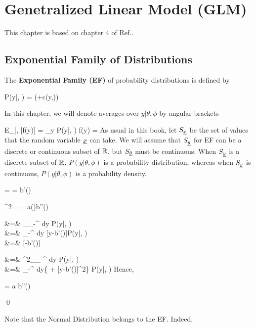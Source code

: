 \chapter{Genetralized Linear Model (GLM)}
\label{ch-gen-lin-mod}

This chapter is based on
chapter 4 of Ref.\cite{agresti-book}.

\section{Exponential Family of Distributions}
\label{sec-exp-fam}

The {\bf Exponential Family (EF)} of probability distributions is defined by

\beq
P(y|\theta, \phi) =
\exp\left(+c(y,\phi)\right)
\eeq

In this chapter, we will
denote averages over $y|\theta, \phi$ by angular brackets

\beq
E_{\rvy|\theta, \phi}[f(y)] = \sum_y P(y|\theta, \phi) f(y) = 
\eeq
As usual in this book, let $S_{\underline{x}}$ be the set of
values that the random variable ${\underline{x}}$ can take.
We will assume that $S_{\underline{y}}$
for EF
can be a discrete or continuous
subset of ${ \mathbb{R}}$,
but $S_{\underline{\theta}}$
must be continuous.
When $S_{\underline{y}}$ is a discrete subset of ${ \mathbb{R}}$, $P(y|\theta, \phi)$
is a probability distribution, whereas when
$S_{\underline{y}}$ is continuous, $P(y|\theta, \phi)$
is a probability density.

\begin{claim}
\beq
\mu = \av{\rvy} = b'(\theta)
\eeq

\beq
\s^2= \av{\rvy, \rvy} = a(\phi)b''(\theta)
\eeq
\end{claim}
\proof

&=& \partial_\theta \int_{-\infty}^\infty
dy\; P(y|\theta, \phi)
\\
&=&
\int_{-\infty}^\infty
dy\;
[y-b'(\theta)]P(y|\theta, \phi)
\\
&=&
[\av{\rvy}-b'(\theta)]
\eeqa

&=& \partial^2_\theta \int_{-\infty}^\infty
dy\; P(y|\theta, \phi)
\\
&=&
\int_{-\infty}^\infty
dy\;\left\{ +
[y-b'(\theta)]^2\right\}
P(y|\theta, \phi)
\eeqa
Hence,

\beq
{}= a b''(\theta)
\eeq

\qed

Note that the Normal Distribution
belongs to the EF. Indeed,

